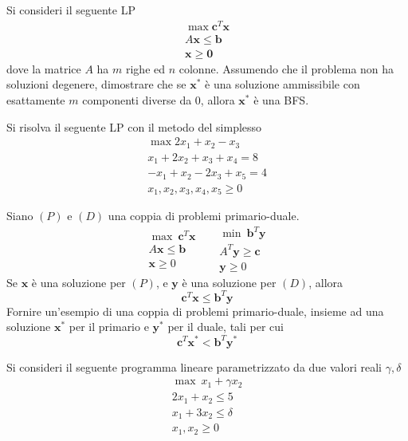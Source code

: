 \documentclass[10pt, letterpaper]{report}
\newcommand{\bb}{{\mathbf{b}}}
\newcommand{\bc}{{\mathbf{c}}}
\newcommand{\x}{{\mathbf{x}}}
\newcommand{\y}{{\mathbf{y}}}
\begin{document}
\begin{esercizio}
\end{esercizio}
Si consideri il seguente LP \begin{eqnarray*}
    \max \bc^T\x\\ A\x\le\bb \\ \x\ge \mathbf 0 
\end{eqnarray*}
dove la matrice $A$ ha $m$ righe ed $n$ colonne.
Assumendo che il problema non ha soluzioni degenere, dimostrare che se $\x^*$ è una soluzione ammissibile con esattamente $m$ componenti diverse da 0, allora $\x^*$ è una BFS.
\begin{esercizio}
\end{esercizio}
Si risolva il seguente LP con il metodo del simplesso \begin{eqnarray*}
    \max 2x_1+x_2-x_3\\ 
    x_1+2x_2+x_3+x_4=8\\ 
    -x_1+x_2-2x_3+x_5=4\\ 
    x_1,x_2,x_3,x_4,x_5\ge 0
\end{eqnarray*}
\begin{esercizio}
\end{esercizio}
Siano $(P)$ e $(D)$ una coppia di problemi primario-duale.
$$\begin{matrix}
        \max \  \mathbf c^T\mathbf x\\ 
        A\mathbf x \le \mathbf b \\ 
        \mathbf x \ge 0 
    \end{matrix} \ \ \ \ \ \  \begin{matrix}
        \min \  \mathbf b^T\mathbf y\\ 
        A^T\mathbf y \ge \mathbf c \\ 
        \mathbf y \ge 0 
    \end{matrix}$$
 Se $\x$ è una soluzione per $(P)$, e $\y$ è una soluzione per $(D)$, allora 
$$ \bc^T\x\le \bb^T\y$$
Fornire un'esempio di una coppia di problemi primario-duale, insieme ad una soluzione $\x^*$ per il primario e $\y^*$ per il duale, tali per cui 
$$ \bc^T\x^*< \bb^T\y^*$$
\begin{esercizio}
\end{esercizio}
Si consideri il seguente programma lineare parametrizzato da due valori reali $\gamma,\delta$
\begin{eqnarray*}
    \max  \ x_1+\gamma x_2\\ 
    2x_1+x_2\le 5\\ 
    x_1+3x_2\le \delta \\ 
    x_1,x_2\ge 0 
\end{eqnarray*}
\end{document}
